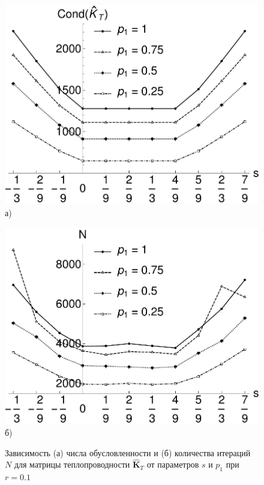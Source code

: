 \begin{figure}[ht]
    \begin{minipage}[b][][b]{0.49\linewidth}\centering
        \includegraphics[width=\linewidth]{pics/ThermalCond.pdf} \\ а)
    \end{minipage}
    \hfill
    \begin{minipage}[b][][b]{0.49\linewidth}\centering
        \includegraphics[width=\linewidth]{pics/ThermalIter.pdf} \\ б)
    \end{minipage}
    \caption{Зависимость (а) числа обусловленности и (б) количества итераций $N$ для матрицы теплопроводности $\widehat{\textbf{K}}_T$ от параметров $s$ и $p_1$ при $r = 0.1$}
    \label{fig:ThermalCondAndIter}
\end{figure}

